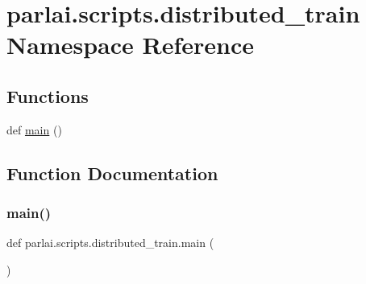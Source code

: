 \hypertarget{namespaceparlai_1_1scripts_1_1distributed__train}{}\section{parlai.\+scripts.\+distributed\+\_\+train Namespace Reference}
\label{namespaceparlai_1_1scripts_1_1distributed__train}
\subsection*{Functions}
\begin{DoxyCompactItemize}
\item 
def \hyperlink{namespaceparlai_1_1scripts_1_1distributed__train_a8fb5ab65a3210ae3a91ec244aeaf49f7}{main} ()
\end{DoxyCompactItemize}


\subsection{Function Documentation}
\mbox{\label{namespaceparlai_1_1scripts_1_1distributed__train_a8fb5ab65a3210ae3a91ec244aeaf49f7}} 
\subsubsection{\texorpdfstring{main()}{main()}}
{\footnotesize\ttfamily def parlai.\+scripts.\+distributed\+\_\+train.\+main (\begin{DoxyParamCaption}{ }\end{DoxyParamCaption})}

